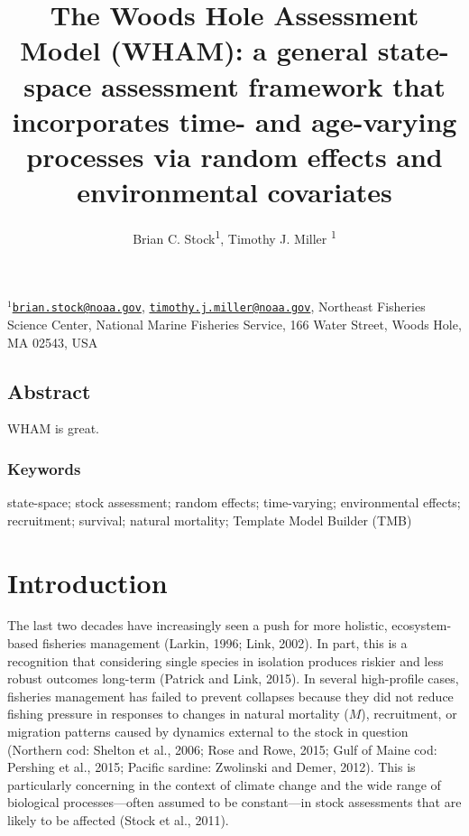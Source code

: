 \documentclass[]{article}
\title{The Woods Hole Assessment Model (WHAM): a general state-space assessment
framework that incorporates time- and age-varying processes via random
effects and environmental covariates}
\author{Brian C. Stock\textsuperscript{1}, Timothy J. Miller \textsuperscript{1}}
\date{}
\begin{document}
\maketitle

\(^1\)\href{mailto:brian.stock@noaa.gov}{\nolinkurl{brian.stock@noaa.gov}},
\href{mailto:timothy.j.miller@noaa.gov}{\nolinkurl{timothy.j.miller@noaa.gov}},
Northeast Fisheries Science Center, National Marine Fisheries Service,
166 Water Street, Woods Hole, MA 02543, USA\\

\pagebreak

\hypertarget{abstract}{%
\subsection*{Abstract}\label{abstract}}

WHAM is great.

\hypertarget{keywords}{%
\subsubsection*{Keywords}\label{keywords}}

state-space; stock assessment; random effects; time-varying;
environmental effects; recruitment; survival; natural mortality;
Template Model Builder (TMB)

\pagebreak

\hypertarget{introduction}{%
\section{Introduction}\label{introduction}}

The last two decades have increasingly seen a push for more holistic,
ecosystem-based fisheries management (Larkin, 1996; Link, 2002). In
part, this is a recognition that considering single species in isolation
produces riskier and less robust outcomes long-term (Patrick and Link,
2015). In several high-profile cases, fisheries management has failed to
prevent collapses because they did not reduce fishing pressure in
responses to changes in natural mortality (\(M\)), recruitment, or
migration patterns caused by dynamics external to the stock in question
(Northern cod: Shelton et al., 2006; Rose and Rowe, 2015; Gulf of Maine
cod: Pershing et al., 2015; Pacific sardine: Zwolinski and Demer, 2012).
This is particularly concerning in the context of climate change and the
wide range of biological processes---often assumed to be constant---in
stock assessments that are likely to be affected (Stock et al., 2011).
\end{document}
